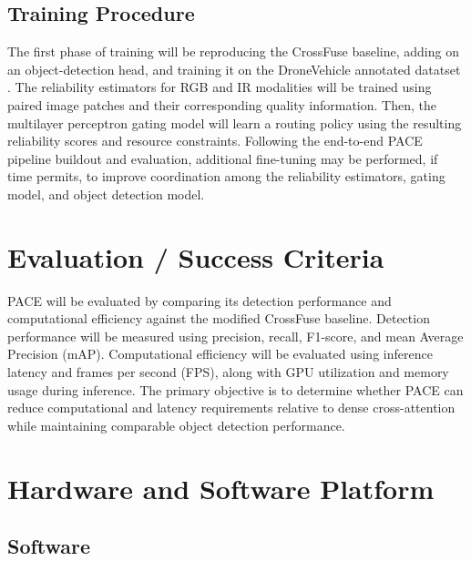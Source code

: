 \documentclass[conference]{IEEEtran}
\begin{document}
\subsection{Training Procedure}

The first phase of training will be reproducing the CrossFuse baseline, adding on an object-detection head, and training it on the DroneVehicle annotated datatset \cite{dronevehicle}. The reliability estimators for RGB and IR modalities will be trained using paired image patches and their corresponding quality information. Then, the multilayer perceptron gating model will learn a routing policy using the resulting reliability scores and resource constraints. Following the end-to-end PACE pipeline buildout and evaluation, additional fine-tuning may be performed, if time permits, to improve coordination among the reliability estimators, gating model, and object detection model. 


\section{Evaluation / Success Criteria}

PACE will be evaluated by comparing its detection performance and computational efficiency against the modified CrossFuse baseline. Detection performance will be measured using precision, recall, F1-score, and mean Average Precision (mAP). Computational efficiency will be evaluated using inference latency and frames per second (FPS), along with GPU utilization and memory usage during inference. The primary objective is to determine whether PACE can reduce computational and latency requirements relative to dense cross-attention while maintaining comparable object detection performance.

\color{black}
\section{Hardware and Software Platform}
\color{black}

\subsection{Software}
\end{document}
